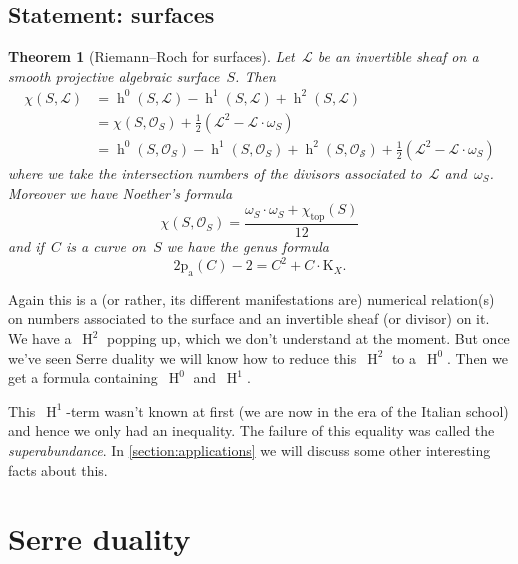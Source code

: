 \documentclass[10pt,a4paper]{article}
\theoremstyle{lecture}
\newtheorem{theorem}{Theorem}
\DeclareMathOperator\hh{h}
\DeclareMathOperator\HH{H}
\begin{document}
\subsection{Statement: surfaces}
\label{subsection:statement-surfaces}
\begin{theorem}[Riemann--Roch for surfaces]
  \label{theorem:riemann-roch-surfaces}
  Let~$\mathcal{L}$ be an invertible sheaf on a smooth projective algebraic surface~$S$. Then
  \begin{equation}
    \begin{aligned}
    \chi(S,\mathcal{L})&=\hh^0(S,\mathcal{L})-\hh^1(S,\mathcal{L})+\hh^2(S,\mathcal{L}) \\
    &=\chi(S,\mathcal{O}_S)+\frac{1}{2}(\mathcal{L}^2-\mathcal{L}\cdot\omega_S) \\
    &=\hh^0(S,\mathcal{O}_S)-\hh^1(S,\mathcal{O}_S)+\hh^2(S,\mathcal{O_S})+\frac{1}{2}(\mathcal{L}^2-\mathcal{L}\cdot\omega_S)
    \end{aligned}
  \end{equation}
  where we take the intersection numbers of the divisors associated to~$\mathcal{L}$ and~$\omega_S$. Moreover we have \emph{Noether's formula}
  \begin{equation}
    \chi(S,\mathcal{O}_S)=\frac{\omega_S\cdot\omega_S+\chi_{\mathrm{top}}(S)}{12}
  \end{equation}
  and if~$C$ is a curve on~$S$ we have the \emph{genus formula}
  \begin{equation}
    2\mathrm{p}_{\mathrm{a}}(C)-2=C^2+C\cdot\mathrm{K}_X.
  \end{equation}
\end{theorem}
Again this is a (or rather, its different manifestations are) numerical relation(s) on numbers associated to the surface and an invertible sheaf (or divisor) on it. We have a~$\HH^2$ popping up, which we don't understand at the moment. But once we've seen Serre duality we will know how to reduce this~$\HH^2$ to a~$\HH^0$. Then we get a formula containing~$\HH^0$ and~$\HH^1$.

This~$\HH^1$-term wasn't known at first (we are now in the era of the Italian school) and hence we only had an inequality. The failure of this equality was called the \emph{superabundance}. In \cref{section:applications} we will discuss some other interesting facts about this.


\section{Serre duality}
\label{section:serre-duality}
\end{document}
